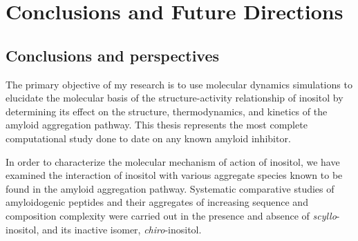 \chapter{Conclusions and Future Directions}







\section{Conclusions and perspectives}

The primary objective of my research is to use molecular dynamics simulations to elucidate the molecular basis of the structure-activity relationship of inositol by determining its effect on the structure, thermodynamics, and kinetics of the amyloid aggregation pathway. This thesis represents the most complete computational study done to date on any known amyloid inhibitor.

In order to characterize the molecular mechanism of action of inositol, we have examined the interaction of inositol with various aggregate species known to be found in the amyloid aggregation pathway. Systematic comparative studies of amyloidogenic peptides and their aggregates of increasing sequence and composition complexity were carried out in the presence and absence of \emph{scyllo}-inositol, and its inactive isomer, \emph{chiro}-inositol.

